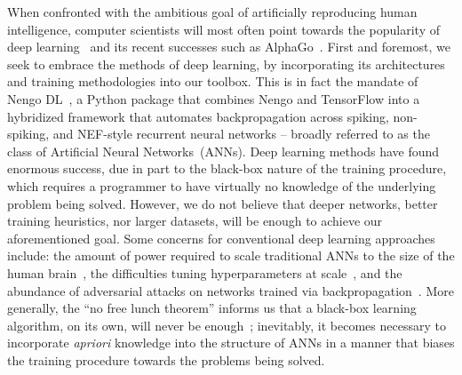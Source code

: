 When confronted with the ambitious goal of artificially reproducing human intelligence, computer scientists will most often point towards
the popularity of deep learning~\citep{lecun2015deep} and its recent successes such as AlphaGo~\citep{gibney2016google}.
First and foremost, we seek to embrace the methods of deep learning, by incorporating its architectures and training methodologies into our toolbox.
This is in fact the mandate of Nengo DL~\citep{rasmussen2018nengodl}, a Python package that combines Nengo and TensorFlow into a hybridized framework that automates backpropagation across spiking, non-spiking, and NEF-style recurrent neural networks -- broadly referred to as the class of Artificial Neural Networks~(ANNs).
Deep learning methods have found enormous success, due in part to the black-box nature of the training procedure, which requires a programmer to have virtually no knowledge of the underlying problem being solved.
However, we do not believe that deeper networks, better training heuristics, nor larger datasets, will be enough to achieve our aforementioned goal.
Some concerns for conventional deep learning approaches include: the amount of power required to scale traditional ANNs to the size of the human brain~\citep{furber2012build}, the difficulties tuning hyperparameters at scale~\citep{bergstra2015hyperopt}, and the abundance of adversarial attacks on networks trained via backpropagation~\citep{su2019one}.
More generally, the ``no free lunch theorem'' informs us that a black-box learning algorithm, on its own, will never be enough~\citep{wolpert1996lack}; inevitably, it becomes necessary to incorporate \emph{apriori} knowledge into the structure of ANNs in a manner that biases the training procedure towards the problems being solved.

